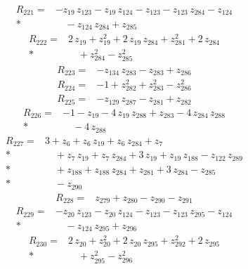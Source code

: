 \documentclass[10pt]{article}
\begin{document}
\begin{align*}
R_{221}={}& - z_{19}\,z_{123} - z_{19}\,z_{124} - z_{123} - z_{123}\,z_{284} - z_{124} \\*
&\quad - z_{124}\,z_{284} + z_{285}
\end{align*}
\begin{align*}
R_{222}={}& 2\,z_{19} + z_{19}^{2} + 2\,z_{19}\,z_{284} + z_{281}^{2} + 2\,z_{284} \\*
&\quad + z_{284}^{2} - z_{285}^{2}
\end{align*}
\begin{align*}
R_{223}={}& - z_{134}\,z_{283} - z_{283} + z_{286}
\end{align*}
\begin{align*}
R_{224}={}& - 1 + z_{282}^{2} + z_{283}^{2} - z_{286}^{2}
\end{align*}
\begin{align*}
R_{225}={}& - z_{129}\,z_{287} - z_{281} + z_{282}
\end{align*}
\begin{align*}
R_{226}={}& - 1 - z_{19} - 4\,z_{19}\,z_{288} + z_{283} - 4\,z_{284}\,z_{288} \\*
&\quad - 4\,z_{288}
\end{align*}
\begin{align*}
R_{227}={}& 3 + z_{6} + z_{6}\,z_{19} + z_{6}\,z_{284} + z_{7} \\*
&\quad + z_{7}\,z_{19} + z_{7}\,z_{284} + 3\,z_{19} + z_{19}\,z_{188} - z_{122}\,z_{289} \\*
&\quad + z_{188} + z_{188}\,z_{284} + z_{281} + 3\,z_{284} - z_{285} \\*
&\quad - z_{290}
\end{align*}
\begin{align*}
R_{228}={}& z_{279} + z_{280} - z_{290} - z_{291}
\end{align*}
\begin{align*}
R_{229}={}& - z_{20}\,z_{123} - z_{20}\,z_{124} - z_{123} - z_{123}\,z_{295} - z_{124} \\*
&\quad - z_{124}\,z_{295} + z_{296}
\end{align*}
\begin{align*}
R_{230}={}& 2\,z_{20} + z_{20}^{2} + 2\,z_{20}\,z_{295} + z_{292}^{2} + 2\,z_{295} \\*
&\quad + z_{295}^{2} - z_{296}^{2}
\end{align*}
\end{document}
